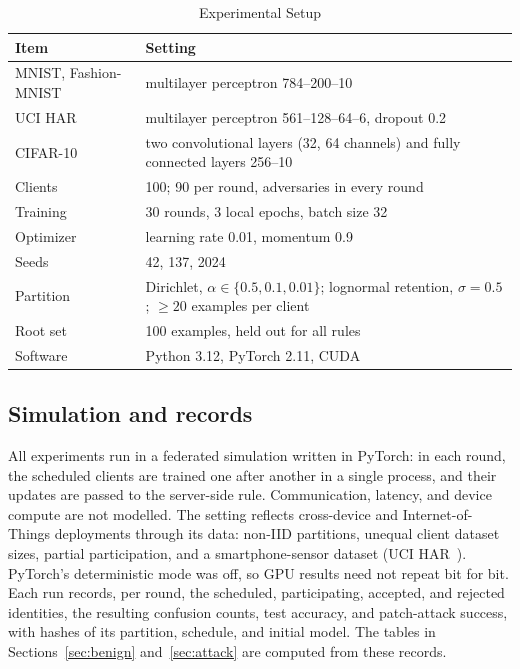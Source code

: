 \documentclass[journal]{IEEEtran}
\begin{document}
\begin{table}[!t]
\centering\footnotesize
\setlength{\tabcolsep}{4pt}
\caption{Experimental Setup}\label{tab:setup}
\begin{tabular}{@{}lp{}@{}}
\toprule
Item & Setting \\
\midrule
MNIST, Fashion-MNIST & multilayer perceptron 784--200--10 \\
UCI HAR & multilayer perceptron 561--128--64--6, dropout 0.2 \\
CIFAR-10 & two convolutional layers (32, 64 channels) and fully connected layers 256--10 \\
\addlinespace[2pt]
Clients & 100; 90 per round, adversaries in every round \\
Training & 30 rounds, 3 local epochs, batch size 32 \\
Optimizer & learning rate 0.01, momentum 0.9 \\
Seeds & 42, 137, 2024 \\
Partition & Dirichlet, $\alpha\in\{0.5,0.1,0.01\}$; lognormal retention, $\sigma=0.5$; $\geq20$ examples per client \\
Root set & 100 examples, held out for all rules \\
Software & Python 3.12, PyTorch 2.11, CUDA \\
\bottomrule
\end{tabular}
\end{table}

\subsection{Simulation and records}
All experiments run in a federated simulation written in PyTorch: in each round, the scheduled clients are trained one after another in a single process, and their updates are passed to the server-side rule. Communication, latency, and device compute are not modelled. The setting reflects cross-device and Internet-of-Things deployments through its data: non-IID partitions, unequal client dataset sizes, partial participation, and a smartphone-sensor dataset (UCI HAR~\cite{anguita2013har}). PyTorch's deterministic mode was off, so GPU results need not repeat bit for bit. Each run records, per round, the scheduled, participating, accepted, and rejected identities, the resulting confusion counts, test accuracy, and patch-attack success, with hashes of its partition, schedule, and initial model. The tables in Sections~\ref{sec:benign} and~\ref{sec:attack} are computed from these records.
\end{document}
